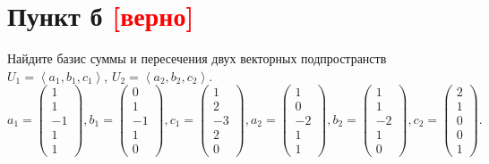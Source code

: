 \documentclass[12pt]{article}
\begin{document}
    \section*{Пункт б \textcolor{red}{[верно]}}
    Найдите базис суммы и пересечения двух векторных подпространств $U_1 = \left < a_1, b_1, c_1 \right >$, $U_2 = \left < a_2, b_2, c_2 \right >$.
    \[
        a_1 =
        \begin{pmatrix}
            1 \\ 1 \\ -1 \\ 1 \\ 1
        \end{pmatrix},
        b_1 =
        \begin{pmatrix}
            0 \\ 1 \\ -1 \\ 1 \\ 0
        \end{pmatrix},
        c_1 =
        \begin{pmatrix}
            1 \\ 2 \\ -3 \\ 2 \\ 0
        \end{pmatrix},
        a_2 =
        \begin{pmatrix}
            1 \\ 0 \\ -2 \\ 1 \\ 1
        \end{pmatrix},
        b_2 =
        \begin{pmatrix}
            1 \\ 1 \\ -2 \\ 1 \\ 0
        \end{pmatrix},
        c_2 =
        \begin{pmatrix}
            2 \\ 1 \\ 0 \\ 0 \\ 1
        \end{pmatrix}.
    \]
\end{document}
